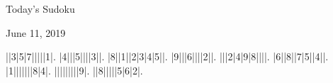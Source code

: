 \documentclass{article}
\begin{document}
\begin{center}
\Huge{Today's Sudoku}
\end{center}
\begin{center}
\Large{June 11, 2019}
\end{center}
\begin{sudoku}
||3|5|7|||||1|.
|4|||5||||3||.
|8||1||2|3|4|5||.
|9|||6||||2||.
|||2|4|9|8||||.
|6||8||7|5||4||.
|1|||||||8|4|.
|||||||||9|.
||8|||||5|6|2|.
\end{sudoku}
\end{document}

